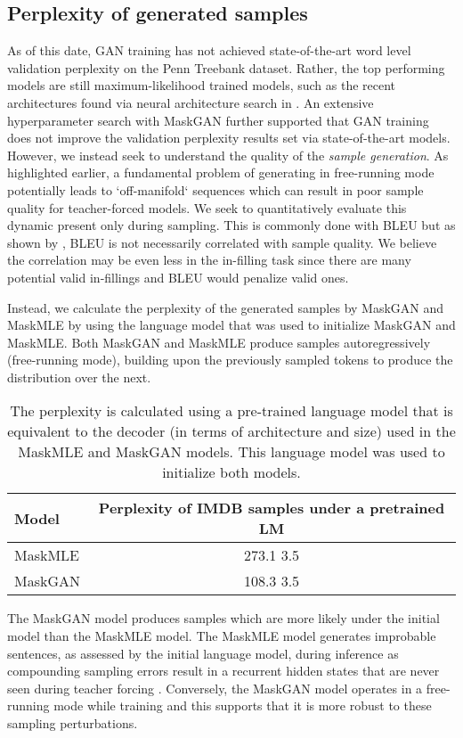 \subsection{Perplexity of generated samples}
As of this date, GAN training has not achieved state-of-the-art word level validation perplexity on the Penn Treebank dataset.  Rather, the top performing models are still maximum-likelihood trained models, such as the recent architectures found via neural architecture search in \cite{zoph2016neural}.  An extensive hyperparameter search with MaskGAN further supported that GAN training does not improve the validation perplexity results set via state-of-the-art models.  However, we instead seek to understand the quality of the \textit{sample generation}.  As highlighted earlier, a fundamental problem of generating in free-running mode potentially leads to `off-manifold` sequences which can result in poor sample quality for teacher-forced models.  We seek to quantitatively evaluate this dynamic present only during sampling. This is commonly done with BLEU but as shown by \cite{gnmt}, BLEU is not necessarily correlated with sample quality. We believe the correlation may be even less in the in-filling task since there are many potential valid in-fillings and BLEU would penalize valid ones.

Instead, we calculate the perplexity of the generated samples by MaskGAN and MaskMLE by using the language model that was used to initialize MaskGAN and MaskMLE.  Both MaskGAN and MaskMLE produce samples autoregressively (free-running mode), building upon the previously sampled tokens to produce the distribution over the next.    

\begin{table}
  \centering
  \begin{tabular}{lc}
    \toprule
    Model & Perplexity of IMDB samples under a pretrained LM \\
    \midrule
    MaskMLE & 273.1  3.5 \\
MaskGAN & 108.3  3.5 \\
\bottomrule
  \end{tabular}
  \caption{The perplexity is calculated using a pre-trained language model that is equivalent to the decoder (in terms of architecture and size) used in the MaskMLE and MaskGAN models. This language model was used to initialize both models.}
\end{table}

The MaskGAN model produces samples which are more likely under the initial model than the MaskMLE model.  The MaskMLE model generates improbable sentences, as assessed by the initial language model, during inference as compounding sampling errors result in a recurrent hidden states that are never seen during teacher forcing \citep{lamb2016professor}.  Conversely, the MaskGAN model operates in a free-running mode while training and this supports that it is more robust to these sampling perturbations.


